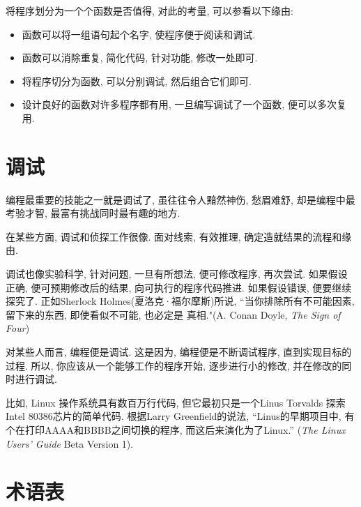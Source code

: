 \documentclass[10pt]{book}
\begin{document}
将程序划分为一个个函数是否值得, 对此的考量, 可以参看以下缘由:

\begin{itemize}

\item 函数可以将一组语句起个名字, 使程序便于阅读和调试. 

\item 函数可以消除重复, 简化代码, 针对功能, 修改一处即可. 

\item 将程序切分为函数, 可以分别调试, 然后组合它们即可. 

\item 设计良好的函数对许多程序都有用, 一旦编写调试了一个函数, 
便可以多次复用. 

\end{itemize}


\section{调试}

编程最重要的技能之一就是调试了, 虽往往令人黯然神伤, 愁眉难舒, 
却是编程中最考验才智, 最富有挑战同时最有趣的地方.

在某些方面, 调试和侦探工作很像. 面对线索, 有效推理, 确定造就结果的流程和缘由. 

调试也像实验科学, 针对问题, 一旦有所想法, 便可修改程序, 再次尝试. 
如果假设正确, 便可预期修改后的结果, 向可执行的程序代码推进. 
如果假设错误, 便要继续探究了. 正如Sherlock Holmes(夏洛克·福尔摩斯)所说, 
``当你排除所有不可能因素, 留下来的东西, 即使看似不可能, 也必定是
真相."(A. Conan Doyle, {\em The Sign of Four})

对某些人而言, 编程便是调试. 这是因为, 编程便是不断调试程序, 直到实现目标的过程. 
所以, 你应该从一个能够工作的程序开始, 逐步进行小的修改, 并在修改的同时进行调试. 

比如, Linux 操作系统具有数百万行代码,  但它最初只是一个Linus Torvalds
探索Intel 80386芯片的简单代码. 根据Larry Greenfield的说法, 
``Linus的早期项目中, 有个在打印AAAA和BBBB之间切换的程序, 而这后来演化为了Linux.''
({\em The Linux Users' Guide} Beta Version 1).


\section{术语表}
\end{document}
